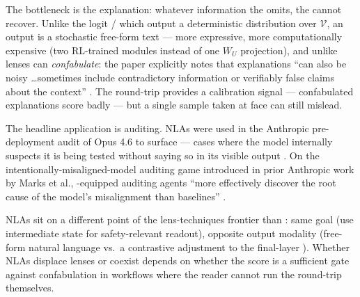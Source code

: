 The bottleneck is the explanation: whatever information the  omits,
the  cannot recover. Unlike the logit /  which output a
deterministic distribution over $\mathcal{V}$, an  output is a
stochastic free-form text — more expressive, more computationally
expensive (two RL-trained  modules instead of one $W_U$
projection), and unlike lenses can \emph{confabulate}: the paper
explicitly notes that  explanations
``can also be noisy \ldots sometimes include contradictory information
or verifiably false claims about the context''
\citep[\S Limitations;
kb/excerpts/anthropic2026-nla\#sec-confabulation]{anthropic2026-nla}.
The round-trip  provides a calibration signal — confabulated
explanations score badly — but a single sample taken at face 
can still mislead.

The headline application is auditing. NLAs were used in
the Anthropic pre-deployment audit of  Opus 4.6 to surface
 — cases where the model internally suspects it is being
tested without saying so in its visible output
\citep[\S Quantitative Evaluations;
kb/excerpts/anthropic2026-nla\#sec-auditing]{anthropic2026-nla}.
On the intentionally-misaligned-model auditing game introduced in
prior Anthropic work by Marks et al., -equipped auditing agents
``more effectively discover the root cause of the model's
misalignment than baselines''
\citep[\S Quantitative Evaluations]{anthropic2026-nla} .

NLAs sit on a different point of the lens-techniques frontier than
: same goal (use intermediate state for safety-relevant readout),
opposite output modality (free-form natural language vs.\ a contrastive
adjustment to the final-layer ). Whether NLAs displace lenses
or coexist depends on whether the  score is a sufficient gate
against confabulation in workflows where the reader cannot run the
round-trip themselves.

